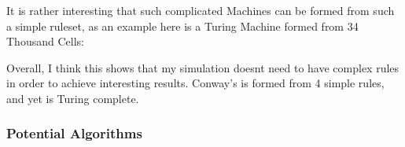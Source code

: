 \begin{flushleft}
                    \vspace{0.2cm}
                    It is rather interesting that such complicated Machines can be formed from such a simple ruleset, as an example 
                    here is a Turing Machine formed from 34 Thousand Cells: \\

                    \begin{figure}[h]
                        \centering
                    \end{figure}

                    Overall, I think this shows that my simulation doesnt need to have complex rules in order to achieve 
                    interesting results. Conway's is formed from 4 simple rules, and yet is Turing complete.
            \subsubsection{Potential Algorithms}
                \large

\end{flushleft}
